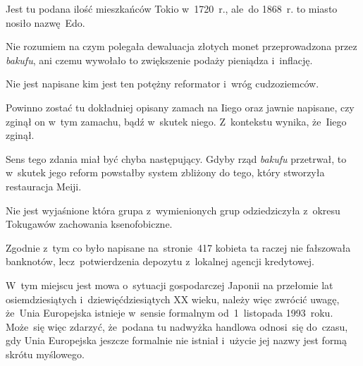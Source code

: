\documentclass[a4paper,11pt]{article}
\begin{document}
\vspace{\spaceTwo}






\start {} Jest tu podana ilość mieszkańców Tokio w~1720~r.,
ale~do 1868~r. to miasto nosiło nazwę~Edo.

\vspace{\spaceFour}


\start {} Nie rozumiem na czym polegała dewaluacja złotych monet
przeprowadzona przez \emph{bakufu}, ani czemu wywołało to zwiększenie
podaży pieniądza i~inflację.

\vspace{\spaceFour}


\start {} Nie jest napisane kim jest ten potężny
reformator i~wróg cudzoziemców.

\vspace{\spaceFour}


\start {} Powinno zostać tu dokładniej opisany zamach na Iiego
oraz jawnie napisane, czy zginął on w~tym zamachu, bądź w~skutek
niego. Z~kontekstu wynika, że~Iiego zginął.

\vspace{\spaceFour}


\start {} Sens tego zdania miał być chyba następujący. Gdyby
rząd \emph{bakufu} przetrwał, to w~skutek jego reform powstałby system
zbliżony do tego, który stworzyła restauracja Meiji.

\vspace{\spaceFour}


\start {} Nie jest wyjaśnione która grupa
z~wymienionych grup odziedziczyła z~okresu Tokugawów zachowania
ksenofobiczne.

\vspace{\spaceFour}


\start {} Zgodnie z~tym co było napisane na~stronie~417
kobieta ta raczej nie fałszowała banknotów, lecz~potwierdzenia
depozytu z~lokalnej agencji kredytowej.

\vspace{\spaceFour}


\start {} W~tym miejscu jest mowa o~sytuacji gospodarczej
Japonii na przełomie lat osiemdziesiątych i~dziewięćdziesiątych XX
wieku, należy więc zwrócić uwagę, że~Unia Europejska istnieje w~sensie
formalnym od~1~listopada 1993~roku. Może~się więc zdarzyć, że~podana
tu nadwyżka handlowa odnosi~się do~czasu, gdy Unia Europejska jeszcze
formalnie nie istniał i~użycie jej nazwy jest formą skrótu myślowego.
\end{document}
